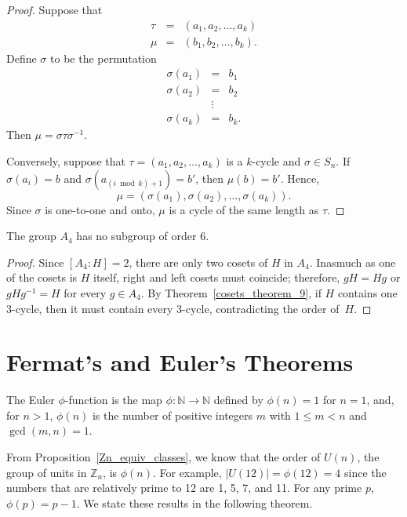 \begin{proof}
Suppose that
\begin{eqnarray*}
\tau & = & (a_1, a_2, \ldots, a_k ) \\
\mu  & = & (b_1, b_2, \ldots, b_k ).
\end{eqnarray*}
Define $\sigma$ to be the permutation
\begin{eqnarray*}
\sigma( a_1 ) & = & b_1 \\
\sigma( a_2 ) & = & b_2 \\
& \vdots &  \\
\sigma( a_k ) & = & b_k.
\end{eqnarray*}
Then $\mu = \sigma \tau \sigma^{-1}$.

Conversely, suppose that $\tau = (a_1, a_2, \ldots, a_k )$ is a $k$-cycle and $\sigma \in S_n$. If $\sigma( a_i ) = b$ and $\sigma( a_{(i \bmod k) + 1} ) = b'$, then $\mu( b) = b'$.  Hence, 
\[
\mu = ( \sigma(a_1), \sigma(a_2), \ldots, \sigma(a_k) ).
\]
Since $\sigma$ is one-to-one and onto, $\mu$ is a cycle of the same length as $\tau$. 
\end{proof}

\begin{corollary}\label{cosets_theorem_10}
The group $A_4$ has no subgroup of order 6.
\end{corollary}

\begin{proof}
Since $[A_4 : H] = 2$, there are only two cosets of $H$ in $A_4$.  Inasmuch as one of the cosets is $H$ itself, right and left cosets must coincide; therefore, $gH = Hg$ or $g H g^{-1} = H$ for every $g \in A_4$.  By Theorem~\ref{cosets_theorem_9}, if $H$ contains one 3-cycle, then it must contain every 3-cycle, contradicting the order of~$H$. \hspace*{1in}
\end{proof}
 

\section{Fermat's and Euler's Theorems}

The {\bfi Euler} $\phi$-{\bfi function\/} is the map $\phi : {\mathbb N } \rightarrow {\mathbb N}$ defined by $\phi(n) = 1$ for $n=1$, and, for $n > 1$,  $\phi(n)$ is the number of positive integers $m$ with $1 \leq m < n$ and $\gcd(m,n) = 1$. 

From Proposition~\ref{Zn_equiv_classes}, we know that the order of $U(n)$, the group of units in ${\mathbb Z}_n$, is $\phi(n)$. For example, $|U(12)| = \phi(12)  = 4$ since the numbers that are relatively prime to 12 are 1, 5, 7, and 11. For any prime $p$, $\phi(p) = p-1$.  We state these results in the following theorem.

